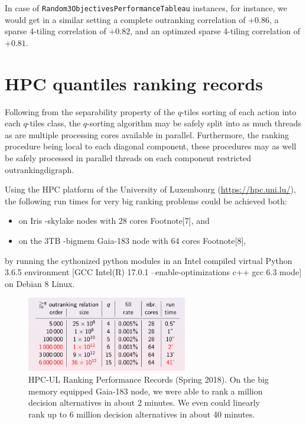 In case of \texttt{Random3ObjectivesPerformanceTableau} instances, for instance, we would get in a similar setting a complete outranking correlation of $+0.86$, a sparse 4-tiling correlation of $+0.82$, and an optimzed sparse 4-tiling correlation of $+0.81$.

\section{HPC quantiles ranking records}
\label{sec:12.6}

Following from the separability property of the $q$-tiles sorting of each action into each $q$-tiles class, the $q$-sorting algorithm may be safely split into as much threads as are multiple processing cores available in parallel. Furthermore, the ranking procedure being local to each diagonal component, these procedures may as well be safely processed in parallel threads on each component restricted outrankingdigraph.

Using the HPC platform of the University of Luxembourg (\href{https://hpc.uni.lu/}{https://hpc.uni.lu/}), the following run times for very big ranking problems could be achieved both:
\begin{itemize}
\item on Iris -skylake nodes with 28 cores Footnote[7], and
\item on the 3TB -bigmem Gaia-183 node with 64 cores Footnote[8],
\end{itemize}
by running the cythonized python modules in an Intel compiled virtual Python 3.6.5 environment [GCC Intel(R) 17.0.1 –enable-optimizations c++ gcc 6.3 mode] on Debian 8 Linux.

\begin{figure}[h]
\sidecaption
\includegraphics[width=7cm]{Figures/rankingRecords.png}
\caption{HPC-UL Ranking Performance Records (Spring 2018). On the big memory equipped Gaia-183 node, we were able to rank a million decision alternatives in about 2 minutes. We even could linearly rank up to 6 million decision alternatives in about 40 minutes.}
\label{fig:11.2}       %
\end{figure}
  
